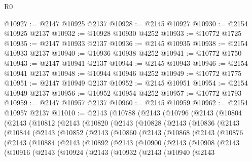 \begin{lexlean}{R0}
\begin{coremodule}
@10927 := @2147 @10925 @2137
@10928 := @2145 @10927
@10930 := @2154 @10925 @2137
@10932 := @10928 @10930 @4252
@10933 := @10772 @1725
@10935 := @2147 @10933 @2137
@10936 := @2145 @10935
@10938 := @2154 @10933 @2137
@10940 := @10936 @10938 @4252
@10941 := @10772 @1750
@10943 := @2147 @10941 @2137
@10944 := @2145 @10943
@10946 := @2154 @10941 @2137
@10948 := @10944 @10946 @4252
@10949 := @10772 @1775
@10951 := @2147 @10949 @2137
@10952 := @2145 @10951
@10954 := @2154 @10949 @2137
@10956 := @10952 @10954 @4252
@10957 := @10772 @1793
@10959 := @2147 @10957 @2137
@10960 := @2145 @10959
@10962 := @2154 @10957 @2137
@11010 := @2143
    (@10788
      (@2143
        (@10796
          (@2143
            (@10804
              (@2143
                (@10812
                  (@2143
                    (@10820
                      (@2143
                        (@10828
                          (@2143
                            (@10836
                              (@2143
                                (@10844
                                  (@2143
                                    (@10852
                                      (@2143
                                        (@10860
                                          (@2143
                                            (@10868
                                              (@2143
                                                (@10876
                                                  (@2143
                                                    (@10884
                                                      (@2143
                                                        (@10892
                                                          (@2143
                                                            (@10900
                                                              (@2143
                                                                (@10908
                                                                  (@2143
                                                                    (@10916
                                                                      (@2143
                                                                        (@10924
                                                                          (@2143
                                                                            (@10932
                                                                              (@2143
                                                                                (@10940
                                                                                  (@2143

\end{coremodule}
\end{lexlean}
